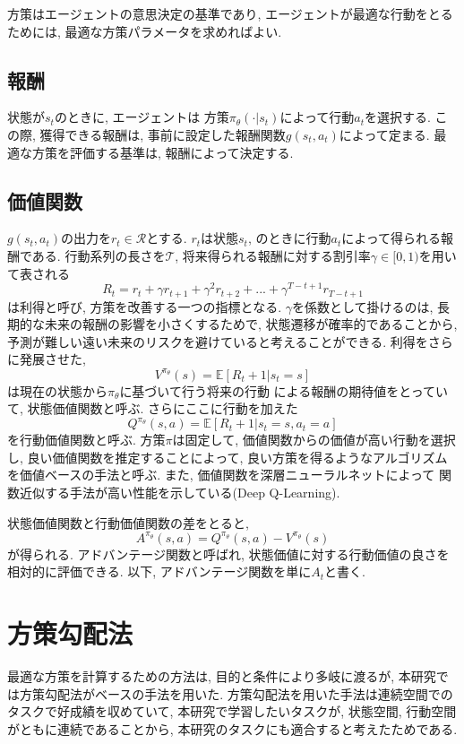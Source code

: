 \documentclass[../main]{subfiles}
\begin{document}
方策はエージェントの意思決定の基準であり, 
エージェントが最適な行動をとるためには, 
最適な方策パラメータを求めればよい.

\subsection{報酬}
状態が$s_t$のときに, エージェントは
方策$\pi_\theta(\cdot|s_t)$によって行動$a_t$を選択する.
この際, 獲得できる報酬は, 
事前に設定した報酬関数$g(s_t, a_t)$によって定まる. 
最適な方策を評価する基準は, 報酬によって決定する.

\subsection{価値関数}
$g(s_t, a_t)$の出力を$r_t \in \mathcal{R}$とする.
$r_t$は状態$s_t$, のときに行動$a_t$によって得られる報酬である.
行動系列の長さを$\mathcal{T}$, 
将来得られる報酬に対する割引率$\gamma \in [0, 1)$を用いて表される
\begin{equation}
R_t = r_t + \gamma r_{t+1} + \gamma^2 r_{t+2} 
+ ... + \gamma^{T-t+1} r_{T-t+1}
\end{equation}
は利得と呼び, 方策を改善する一つの指標となる.
$\gamma$を係数として掛けるのは, 
長期的な未来の報酬の影響を小さくするためで, 
状態遷移が確率的であることから, 
予測が難しい遠い未来のリスクを避けていると考えることができる.
利得をさらに発展させた, 
\begin{equation}
V^{\pi_\theta}(s) = \mathbb{E}[R_t+1|s_t=s]
\end{equation}
は現在の状態から$\pi_\theta$に基づいて行う将来の行動
による報酬の期待値をとっていて, 状態価値関数と呼ぶ.
さらにここに行動を加えた
\begin{equation}
Q^{\pi_\theta}(s, a) = \mathbb{E}[R_t+1|s_t=s, a_t=a]
\end{equation}
を行動価値関数と呼ぶ.
方策$\pi$は固定して, 
価値関数からの価値が高い行動を選択し, 
良い価値関数を推定することによって, 
良い方策を得るようなアルゴリズムを価値ベースの手法と呼ぶ.
また, 価値関数を深層ニューラルネットによって
関数近似する手法が高い性能を示している(Deep Q-Learning).

状態価値関数と行動価値関数の差をとると,
\begin{equation}
A^{\pi_\theta}(s, a) = 
Q^{\pi_\theta}(s, a) - V^{\pi_\theta}(s)
\end{equation}
が得られる. アドバンテージ関数と呼ばれ, 
状態価値に対する行動価値の良さを相対的に評価できる.
以下, アドバンテージ関数を単に$A_t$と書く.

\section{方策勾配法}
最適な方策を計算するための方法は, 
目的と条件により多岐に渡るが, 
本研究では方策勾配法がベースの手法を用いた.
方策勾配法を用いた手法は連続空間でのタスクで好成績を収めていて, 
本研究で学習したいタスクが, 
状態空間, 行動空間がともに連続であることから, 
本研究のタスクにも適合すると考えたためである.
\end{document}
